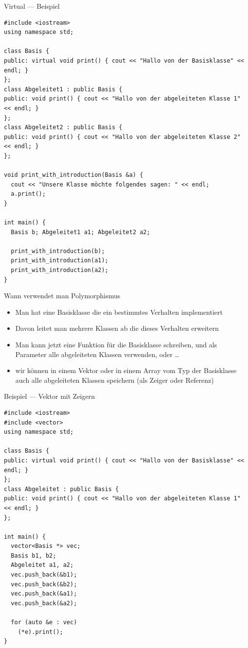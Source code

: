\documentclass[presentation]{beamer}
\begin{document}
\begin{frame}[fragile,label={sec:org3872f2b}]{Virtual --- Beispiel}
 \begin{verbatim}
#include <iostream>
using namespace std;

class Basis {
public: virtual void print() { cout << "Hallo von der Basisklasse" << endl; }
};
class Abgeleitet1 : public Basis {
public: void print() { cout << "Hallo von der abgeleiteten Klasse 1" << endl; }
};
class Abgeleitet2 : public Basis {
public: void print() { cout << "Hallo von der abgeleiteten Klasse 2" << endl; }
};

void print_with_introduction(Basis &a) {
  cout << "Unsere Klasse möchte folgendes sagen: " << endl;
  a.print();
}

int main() {
  Basis b; Abgeleitet1 a1; Abgeleitet2 a2;

  print_with_introduction(b);
  print_with_introduction(a1);
  print_with_introduction(a2);
}
\end{verbatim}
\end{frame}
\begin{frame}[label={sec:org05ccd6c}]{Wann verwendet man Polymorphismus}
\begin{itemize}
\item Man hat eine Basisklasse die ein bestimmtes Verhalten implementiert
\item Davon leitet man mehrere Klassen ab die dieses Verhalten erweitern
\item Man kann jetzt eine Funktion für die Basisklasse schreiben, und als
Parameter alle abgeleiteten Klassen verwenden, oder \ldots{}
\item wir können in einem Vektor oder in einem Array vom Typ der
Basisklasse auch alle abgeleiteten Klassen speichern (als Zeiger
oder Referenz)
\end{itemize}
\end{frame}
\begin{frame}[fragile,label={sec:org967a483}]{Beispiel --- Vektor mit Zeigern}
 \begin{verbatim}
#include <iostream>
#include <vector>
using namespace std;

class Basis {
public: virtual void print() { cout << "Hallo von der Basisklasse" << endl; }
};
class Abgeleitet : public Basis {
public: void print() { cout << "Hallo von der abgeleiteten Klasse 1" << endl; }
};

int main() {
  vector<Basis *> vec;
  Basis b1, b2;
  Abgeleitet a1, a2;
  vec.push_back(&b1);
  vec.push_back(&b2);
  vec.push_back(&a1);
  vec.push_back(&a2);

  for (auto &e : vec)
    (*e).print();
}
\end{verbatim}
\end{frame}
\end{document}

